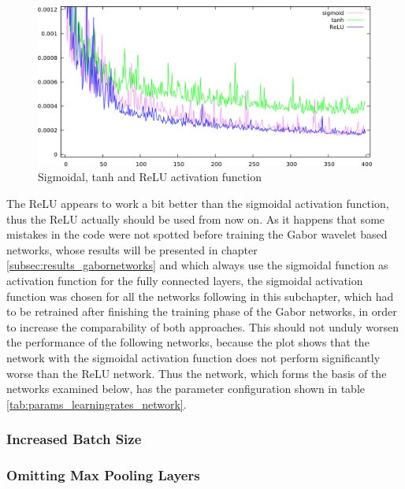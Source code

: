 \documentclass[11pt, a4paper]{article}
\begin{document}
\begin{figure}[h!]
	\centering
	\includegraphics[width=\textwidth]{results/cnn_sigmoid_vs_tanh_vs_relu.png}
	\caption{Sigmoidal, tanh and \ac{ReLU} activation function}
	\label{fig:cnn_sigmoid_vs_tanh_vs_relu}
\end{figure}
\vspace{-0.2cm}
The \ac{ReLU} appears to work a bit better than the sigmoidal activation function, thus the \ac{ReLU} actually should be used from now on. As it happens that some mistakes in the code were not spotted before training the Gabor wavelet based networks, whose results will be presented in chapter \ref{subsec:results_gabornetworks} and which always use the sigmoidal function as activation function for the fully connected layers, the sigmoidal activation function was chosen for all the networks following in this subchapter, which had to be retrained after finishing the training phase of the Gabor networks, in order to increase the comparability of both approaches. This should not unduly worsen the performance of the following networks, because the plot shows that the network with the sigmoidal activation function does not perform significantly worse than the \ac{ReLU} network. Thus the network, which forms the basis of the networks examined below, has the parameter configuration shown in table \ref{tab:params_learningrates_network}.
\vspace{-0.6cm}



\subsubsection{Increased Batch Size}

\subsubsection{Omitting Max Pooling Layers}
\end{document}
